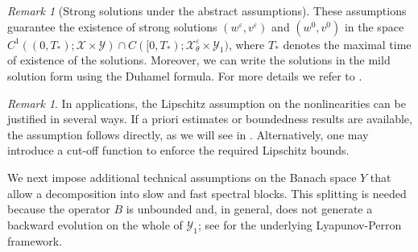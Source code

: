 \documentclass[11pt]{article}
\theoremstyle{definition}
\theoremstyle{remark}
\newtheorem{remark}[theorem]{Remark}
\numberwithin{equation}{section}
\newcommand{\eps}{\varepsilon}
\newcommand{\mc}[1]{\mathcal{#1}}
\begin{document}
\begin{remark}[Strong solutions under the abstract assumptions]\label{rem: existence strong sol}
These assumptions guarantee the existence of strong solutions $(w^\varepsilon,v^\varepsilon)$ and $(w^0,v^0)$ in the space $C^1((0,T_*);\mc X\times \mc Y)\cap C([0,T_*);\mc X_\theta^\eps\times \mc Y_1)$, where $T_*$ denotes the maximal time of existence of the solutions. 
Moreover, we can write the solutions in the mild solution form using the Duhamel formula.
For more details we refer to \cite{lunardi2012analytic}.
\end{remark}

\begin{remark}
In applications, the Lipschitz assumption on the nonlinearities can be justified in several ways.
If a priori estimates or boundedness results are available, the assumption follows directly, as we will see in .
Alternatively, one may introduce a cut-off function to enforce the required Lipschitz bounds.
\end{remark}

We next impose additional technical assumptions on the Banach space \(Y\) that allow a decomposition into slow and fast spectral blocks. This splitting is needed because the operator \(B\) is unbounded and, in general, does not generate a backward evolution on the whole of \(\mc Y_1\); see \cite{hummel2022slow} for the underlying Lyapunov-Perron framework.\\
\end{document}
